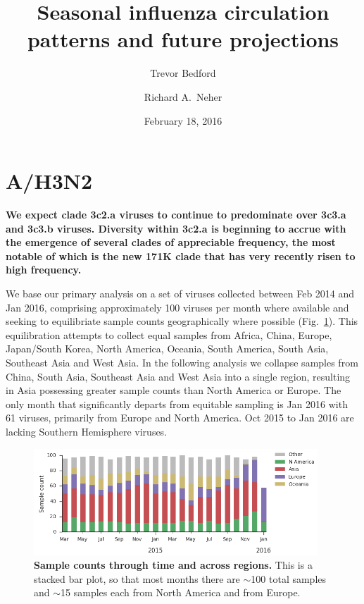 \documentclass[11pt,oneside,letterpaper]{article}
\title{\vspace{2cm} \Large \bf 
Seasonal influenza circulation patterns and future projections
}
\author[1]{Trevor Bedford}
\author[2]{Richard A.\ Neher}
\affil[1]{Vaccine and Infectious Disease Division, Fred Hutchinson Cancer Research Center, Seattle, WA, USA.}
\affil[2]{Max Planck Institute for Developmental Biology, T\"ubingen, Germany.}
\date{February 18, 2016}
\begin{document}
\maketitle

\tableofcontents

\pagebreak

\section*{A/H3N2}

\textbf{We expect clade 3c2.a viruses to continue to predominate over 3c3.a and 3c3.b viruses. Diversity within 3c2.a is beginning to accrue with the emergence of several clades of appreciable frequency, the most notable of which is the new 171K clade that has very recently risen to high frequency.}

We base our primary analysis on a set of viruses collected between Feb 2014 and Jan 2016, comprising approximately 100 viruses per month where available and seeking to equilibriate sample counts geographically where possible (Fig.\ \ref{H3N2_counts}). This equilibration attempts to collect equal samples from Africa, China, Europe, Japan/South Korea, North America, Oceania, South America, South Asia, Southeast Asia and West Asia. In the following analysis we collapse samples from China, South Asia, Southeast Asia and West Asia into a single region, resulting in Asia possessing greater sample counts than North America or Europe. The only month that significantly departs from equitable sampling is Jan 2016 with 61 viruses, primarily from Europe and North America. Oct 2015 to Jan 2016 are lacking Southern Hemisphere viruses.

\begin{figure}[H]
	\centering		
	\includegraphics[width=0.95\textwidth]{../figures/feb-2016/H3N2_counts.png}
	\caption{\textbf{Sample counts through time and across regions.}
	This is a stacked bar plot, so that most months there are $\sim$100 total samples and $\sim$15 samples each from North America and from Europe.
	}
	\label{H3N2_counts}
\end{figure}
\end{document}
